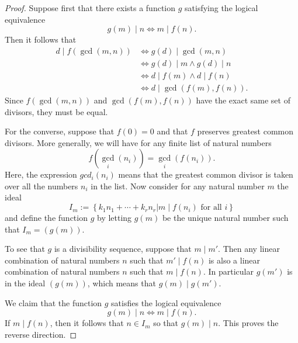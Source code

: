 \begin{proof}
  Suppose first that there exists a function $g$ satisfying the logical equivalence
  \begin{equation*}
    g(m)\mid n \Leftrightarrow m\mid f(n).
  \end{equation*}
  Then it follows that
  \begin{align*}
    d\mid f(\gcd(m,n)) & \Leftrightarrow g(d)\mid \gcd(m,n) \\
                       & \Leftrightarrow g(d)\mid m \land g(d)\mid n \\
                       & \Leftrightarrow d\mid f(m) \land d\mid f(n) \\
                       & \Leftrightarrow d\mid \gcd(f(m),f(n)).
  \end{align*}
  Since $f(\gcd(m,n))$ and $\gcd(f(m),f(n))$ have the exact same set of divisors, they must be equal.
  
  For the converse, suppose that $f(0)=0$ and that $f$ preserves greatest common divisors. More generally, we will have for any finite list of natural numbers
  \begin{equation*}
    f(\gcd_i(n_i))=\gcd_i(f(n_i)).
  \end{equation*}
  Here, the expression $gcd_i(n_i)$ means that the greatest common divisor is taken over all the numbers $n_i$ in the list. Now consider for any natural number $m$ the ideal
  \begin{equation*}
    I_m := \left\{ k_1n_1+\cdots+ k_rn_r \mathbin{\big|} m\mid f(n_i) \text{ for all } i \right\}
  \end{equation*}
  and define the function $g$ by letting $g(m)$ be the unique natural number such that $I_m=(g(m))$.

  To see that $g$ is a divisibility sequence, suppose that $m\mid m'$. Then any linear combination of natural numbers $n$ such that $m'\mid f(n)$ is also a linear combination of natural numbers $n$ such that $m\mid f(n)$. In particular $g(m')$ is in the ideal $(g(m))$, which means that $g(m)\mid g(m')$.

  We claim that the function $g$ satisfies the logical equivalence
  \begin{equation*}
    g(m)\mid n\Leftrightarrow m\mid f(n).
  \end{equation*}
  If $m\mid f(n)$, then it follows that $n\in I_m$ so that $g(m)\mid n$. This proves the reverse direction.


\end{proof}
